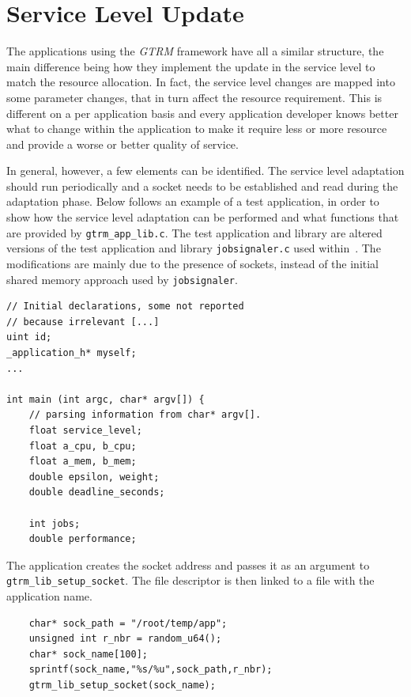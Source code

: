 \documentclass[nobiblatex]{LTHthesis}
\begin{document}
\section{Service Level Update}
\label{sec:servicelevelupdatesection}

The applications using the \emph{GTRM} framework have all a similar structure,
the main difference being how they implement the update in the service
level to match the resource allocation. In fact, the service level changes
are mapped into some parameter changes, that in turn affect the resource
requirement. This is different on a per application basis and every
application developer knows better what to change within the application
to make it require less or more resource and provide a worse or better
quality of service.

In general, however, a few elements can be identified. The service level
adaptation should run periodically and a socket needs to be established
and read during the adaptation phase. Below follows an example of a test application, in order
to show how the service level adaptation can be performed
and what functions that are provided by \texttt{gtrm\_app\_lib.c}.
The test application and library are altered versions of the test 
application and library \texttt{jobsignaler.c} used within~\cite{gtrm}.
The modifications are mainly due to the presence of sockets, instead of
the initial shared memory approach used by \texttt{jobsignaler}.

\begin{lstlisting}
// Initial declarations, some not reported
// because irrelevant [...]
uint id;
_application_h* myself;
...	

int main (int argc, char* argv[]) {
	// parsing information from char* argv[].
	float service_level;
	float a_cpu, b_cpu;
	float a_mem, b_mem;
	double epsilon, weight;
	double deadline_seconds;
	
	int jobs;
	double performance;
\end{lstlisting}

The application creates the socket address and passes it as an argument to 
\texttt{gtrm\_lib\_setup\_socket}. The file descriptor is then linked to
a file with the application name.
\begin{lstlisting}
	char* sock_path = "/root/temp/app";
	unsigned int r_nbr = random_u64();
	char* sock_name[100];
	sprintf(sock_name,"%s/%u",sock_path,r_nbr);
	gtrm_lib_setup_socket(sock_name);
\end{lstlisting}
\end{document}
